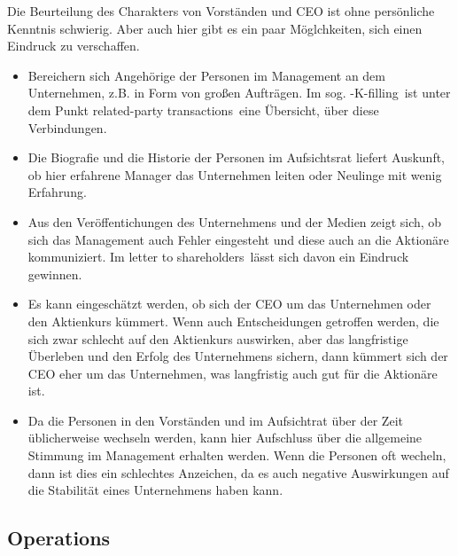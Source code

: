 Die Beurteilung des Charakters von Vorständen und CEO ist ohne persönliche Kenntnis schwierig. 
Aber auch hier gibt es ein paar Möglchkeiten, sich einen Eindruck zu verschaffen.
\begin{itemize}
    \item Bereichern sich Angehörige der Personen im Management an dem Unternehmen, z.B. in Form von großen Aufträgen. 
        Im sog. -K-filling\grqq\ ist unter dem Punkt \glqq related-party transactions\grqq\ eine Übersicht, über diese Verbindungen.
    \item Die Biografie und die Historie der Personen im Aufsichtsrat liefert Auskunft, ob hier erfahrene Manager das Unternehmen leiten oder Neulinge mit wenig Erfahrung.
    \item Aus den Veröffentichungen des Unternehmens und der Medien zeigt sich, ob sich das Management auch Fehler eingesteht und diese auch an die Aktionäre kommuniziert.
        Im \glqq letter to shareholders\grqq\ lässt sich davon ein Eindruck gewinnen. 
    \item Es kann eingeschätzt werden, ob sich der CEO um das Unternehmen oder den Aktienkurs kümmert. 
        Wenn auch Entscheidungen getroffen werden, die sich zwar schlecht auf den Aktienkurs auswirken, aber das langfristige Überleben und den Erfolg des Unternehmens sichern, dann kümmert sich der CEO eher um das Unternehmen, was langfristig auch gut für die Aktionäre ist.
    \item Da die Personen in den Vorständen und im Aufsichtrat über der Zeit üblicherweise wechseln werden, kann hier Aufschluss über die allgemeine Stimmung im Management erhalten werden.
        Wenn die Personen oft wecheln, dann ist dies ein schlechtes Anzeichen, da es auch negative Auswirkungen auf die Stabilität eines Unternehmens haben kann.
\end{itemize}

%
\subsection{Operations}

